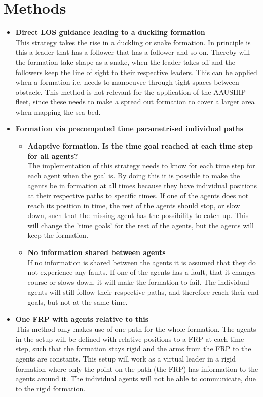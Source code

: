\section{Methods}
\begin{itemize}
\item \textbf{Direct LOS guidance leading to a duckling formation}\\
This strategy takes the rise in a duckling or snake formation. In principle is this a leader that has a follower that has a follower and so on. Thereby will the formation take shape as a snake, when the leader takes off and the followers keep the line of sight to their respective leaders. This can be applied when a formation i.e. needs to manoeuvre through tight spaces between obstacle. This method is not relevant for the application of the AAUSHIP fleet, since these needs to make a spread out formation to cover a larger area when mapping the sea bed.
\item \textbf{Formation via precomputed time parametrised individual paths}
	\begin{itemize}
	\item \textbf{Adaptive formation. Is the time goal reached at each time step for all agents?}\\
	The implementation of this strategy needs to know for each time step for each agent when the goal is. By doing this it is possible to make the agents be in formation at all times because they have individual positions at their respective paths to specific times. If one of the agents does not reach its position in time, the rest of the agents should stop, or slow down, such that the missing agent has the possibility to catch up. This will change the 'time goals' for the rest of the agents, but the agents will keep the formation.
	\item \textbf{No information shared between agents}\\
	If no information is shared between the agents it is assumed that they do not experience any faults. If one of the agents has a fault, that it changes course or slows down, it will make the formation to fail. The individual agents will still follow their respective paths, and therefore reach their end goals, but not at the same time.
	\end{itemize}
\item \textbf{One \ac{FRP} with agents relative to this}\\
This method only makes use of one path for the whole formation. The agents in the setup will be defined with relative positions to a \ac{FRP} at each time step, such that the formation stays rigid and the arms from the \ac{FRP} to the agents are constants. This setup will work as a virtual leader in a rigid formation where only the point on the path (the \ac{FRP}) has information to the agents around it. The individual agents will not be able to communicate, due to the rigid formation.

\end{itemize}
